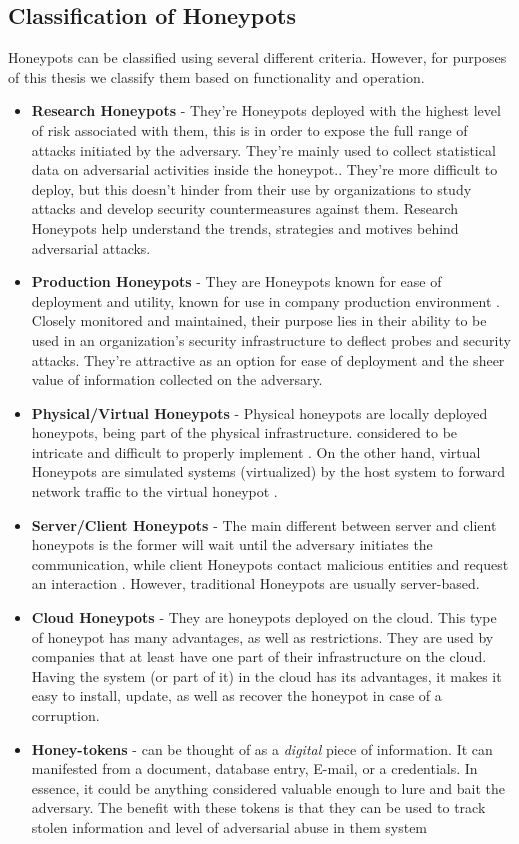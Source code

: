 \documentclass[grad,lot,lof,11pt,oneside,onehalfspace]{RUthesis}
\begin{document}
\subsection{Classification of Honeypots}
Honeypots can be classified using several different criteria. However, for purposes of this thesis we classify them based on functionality and operation. 
\begin{itemize}
\item {\textbf{Research Honeypots} -}
They're Honeypots deployed with the highest level of risk associated with them, this is in order to expose the full range of attacks initiated by the adversary. They're mainly used to collect statistical data on adversarial activities inside the honeypot.\cite{lihet_how_2015}. They're more difficult to deploy, but this doesn't hinder from their use by organizations to study attacks and develop security countermeasures against them. Research Honeypots help understand the trends, strategies and motives behind adversarial attacks\cite{nawrocki_survey_2016}.
\item {\textbf{Production Honeypots} -}
They are Honeypots known for ease of deployment and utility, known for use in company production environment \cite{nawrocki_survey_2016}. Closely monitored and maintained, their purpose lies in their ability to be used in an organization's security infrastructure to deflect probes and security attacks. They're attractive as an option for ease of deployment and the sheer value of information collected on the adversary. 
\item {\textbf{Physical/Virtual Honeypots} -} 
Physical honeypots are locally deployed honeypots, being part of the physical infrastructure. considered to be intricate and difficult to properly implement \cite{lihet_how_2015}. On the other hand, virtual Honeypots are simulated systems (virtualized) by the host system to forward network traffic to the virtual honeypot \cite{nawrocki_survey_2016}.
\item {\textbf{Server/Client Honeypots} -} 
The main different between server and client honeypots is the former will wait until the adversary initiates the communication, while client Honeypots contact malicious entities and request an interaction \cite{nawrocki_survey_2016}. However, traditional Honeypots are usually server-based. 
\item {\textbf{Cloud Honeypots} -}
They are honeypots deployed on the cloud. This type of honeypot has many advantages, as well as restrictions. They are used by companies that at least have one part of their infrastructure on the cloud. Having the system (or part of it) in the cloud has its advantages, it makes it easy to install, update, as well as recover the honeypot in case of a corruption\cite{lihet_how_2015}.
\item {\textbf{Honey-tokens} -}
can be thought of as a \textit{digital} piece of information. It can manifested from a document, database entry, E-mail, or a credentials. In essence, it could be anything considered valuable enough to lure and bait the adversary. The benefit with these tokens is that they can be used to track stolen information and level of adversarial abuse in them system \cite{akiyama_honeycirculator:_2017} 
\end{itemize}
\end{document}
